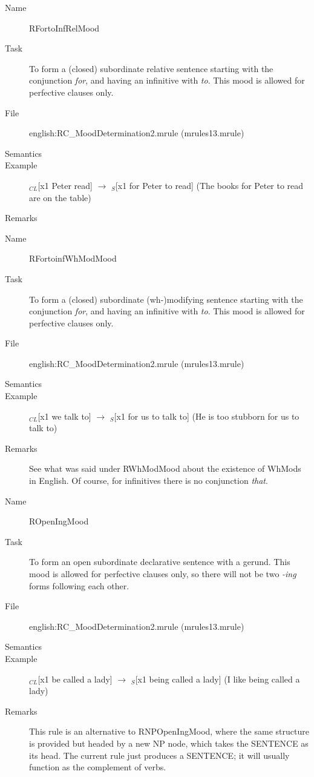 \begin{description}
\vspace{1 cm}
\begin{description}
\item[Name] RFortoInfRelMood
\item[Task] To form a (closed) subordinate relative sentence starting with the
conjunction {\em for\/}, and having an infinitive with {\em to\/}.
This mood is allowed for perfective clauses only.
\item[File] english:RC\_MoodDetermination2.mrule (mrules13.mrule)
\item[Semantics]
\item[Example] $_{CL}$[x1 Peter read] $\rightarrow$ $_S$[x1 for Peter to read]
(The books for Peter to read are on the table)
\item[Remarks]
\end{description}

\vspace{1 cm}
\begin{description}
\item[Name] RFortoinfWhModMood
\item[Task] To form a (closed) subordinate (wh-)modifying sentence starting 
with the
conjunction {\em for\/}, and having an infinitive with {\em to\/}.
This mood is allowed for perfective clauses only.
\item[File] english:RC\_MoodDetermination2.mrule (mrules13.mrule)
\item[Semantics]
\item[Example] $_{CL}$[x1 we talk to] $\rightarrow$ $_S$[x1 for us to talk to]
(He is too stubborn for us to talk to)
\item[Remarks] See what was said under RWhModMood about the existence of WhMods 
in English. Of course, for infinitives there is no conjunction {\em that\/}.
\end{description}

\vspace{1 cm}
\begin{description}
\item[Name] ROpenIngMood
\item[Task] To form an open subordinate declarative sentence with a gerund.
This mood is allowed for perfective clauses only, so there will not be two {\em 
-ing\/} forms following each other.
\item[File] english:RC\_MoodDetermination2.mrule (mrules13.mrule)
\item[Semantics]
\item[Example] $_{CL}$[x1 be called a lady] $\rightarrow$ $_S$[x1 being called 
a lady] (I like being called a lady)
\item[Remarks] This rule is an alternative to RNPOpenIngMood, where the same 
structure is provided but headed by a new NP node, which takes the SENTENCE as 
its head. The current rule just produces a SENTENCE; it will usually function 
as the complement of verbs.
\end{description}


\end{description}
